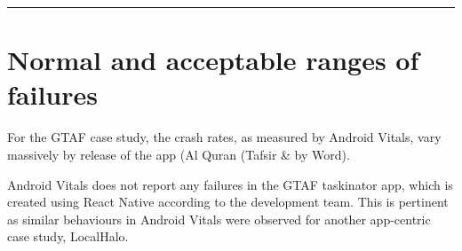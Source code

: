 \noindent\textcolor[RGB]{220,220,220}{\rule{\linewidth}{1pt}}


\section{Normal and acceptable ranges of failures}
For the GTAF case study, the crash rates, as measured by Android Vitals, vary massively by release of the app (Al Quran (Tafsir \& by Word). 

Android Vitals does not report any failures in the GTAF taskinator app, which is created using React Native according to the development team. This is pertinent as similar behaviours in Android Vitals were observed for another app-centric case study, LocalHalo. 

